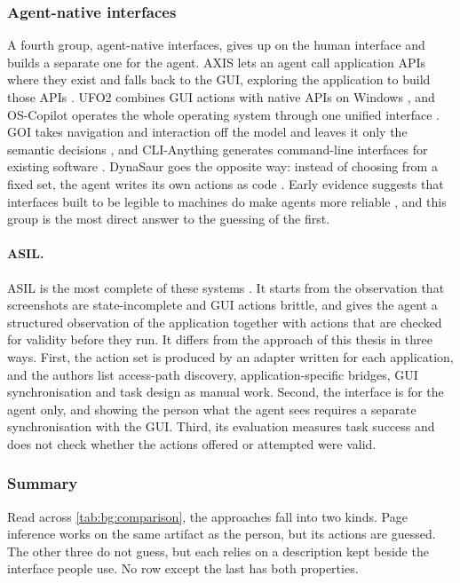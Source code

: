 \subsubsection{Agent-native interfaces}\label{sec:bg:agent-native}

A fourth group, agent-native interfaces, gives up on the human interface and builds a separate one for the agent.
AXIS lets an agent call application APIs where they exist and falls back to the GUI, exploring the application to build those APIs \cite{lu2025axis}.
UFO2 combines GUI actions with native APIs on Windows \cite{zhang2025ufo2}, and OS-Copilot operates the whole operating system through one unified interface \cite{wu2024oscopilot}.
GOI takes navigation and interaction off the model and leaves it only the semantic decisions \cite{wang2026imperative}, and CLI-Anything generates command-line interfaces for existing software \cite{cliAnything}.
DynaSaur goes the opposite way: instead of choosing from a fixed set, the agent writes its own actions as code \cite{nguyen2025dynasaur}.
Early evidence suggests that interfaces built to be legible to machines do make agents more reliable \cite{schultze2025building}, and this group is the most direct answer to the guessing of the first.

\paragraph{ASIL.}
ASIL is the most complete of these systems \cite{xie2026asil}.
It starts from the observation that screenshots are state-incomplete and GUI actions brittle, and gives the agent a structured observation of the application together with actions that are checked for validity before they run.
It differs from the approach of this thesis in three ways.
First, the action set is produced by an adapter written for each application, and the authors list access-path discovery, application-specific bridges, GUI synchronisation and task design as manual work.
Second, the interface is for the agent only, and showing the person what the agent sees requires a separate synchronisation with the GUI.
Third, its evaluation measures task success and does not check whether the actions offered or attempted were valid.

\subsubsection{Summary}\label{sec:bg:comparison-summary}

Read across \autoref{tab:bg:comparison}, the approaches fall into two kinds.
Page inference works on the same artifact as the person, but its actions are guessed.
The other three do not guess, but each relies on a description kept beside the interface people use.
No row except the last has both properties.

